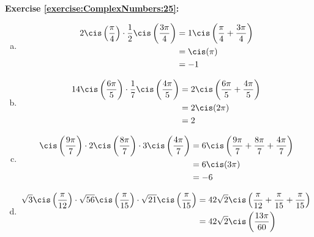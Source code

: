 \noindent\textbf{Exercise \ref{exercise:ComplexNumbers:25}:} %
\begin{enumerate}[(a)]
\item
\begin{align*}
2\cis\left(\frac{\pi}{4}\right) \cdot \frac{1}{2} \cis\left( \frac{3\pi}{4}\right) &= 1\cis\left(\frac{\pi}{4} + \frac{3\pi}{4}\right)\\
&= \cis(\pi)\\
&= -1
\end{align*}

\item 
\begin{align*}
14\cis\left( \frac{6\pi}{5}\right) \cdot \frac{1}{7} \cis\left( \frac{4\pi}{5} \right)  &= 2\cis\left(\frac{6\pi}{5} + \frac{4\pi}{5}\right)\\
&= 2\cis(2\pi)\\
&= 2
\end{align*}

\item
\begin{align*}
\cis\left(\frac{9\pi}{7}\right) \cdot 2 \cis\left( \frac{8\pi}{7}\right) \cdot 3 \cis\left( \frac{4\pi}{7}\right)  &= 6\cis\left(\frac{9\pi}{7} + \frac{8\pi}{7} + \frac{4\pi}{7}\right)\\
&= 6\cis(3\pi)\\
&= -6
\end{align*}

\item 
\begin{align*}
\sqrt{3}\cis\left(\frac{\pi}{12}\right)\cdot \sqrt{56}\cis\left(\frac{\pi}{15}\right)\cdot \sqrt{21}\cis\left(\frac{\pi}{15}\right) &= 42\sqrt{2}\cis\left(\frac{\pi}{12} + \frac{\pi}{15} + \frac{\pi}{15}\right)\\
&= 42\sqrt{2}\cis\left(\frac{13\pi}{60}\right)\\
\end{align*}


\end{enumerate}
